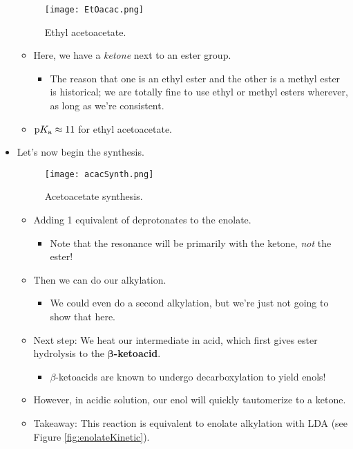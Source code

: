 \documentclass[../notes.tex]{subfiles}
\begin{document}
\begin{itemize}
\begin{figure}[h!]
        \centering
        \texttt{[image: EtOacac.png]}
        \caption{Ethyl acetoacetate.}
        \label{fig:EtOacac}
    \end{figure}
    \begin{itemize}
        \item Here, we have a \emph{ketone} next to an ester group.
        \begin{itemize}
            \item The reason that one is an ethyl ester and the other is a methyl ester is historical; we are totally fine to use ethyl or methyl esters wherever, as long as we're consistent.
        \end{itemize}
        \item $\textup{p}K_\textup{a}\approx 11$ for ethyl acetoacetate.
    \end{itemize}
    \item Let's now begin the synthesis.
    \begin{figure}[H]
        \centering
        \texttt{[image: acacSynth.png]}
        \caption{Acetoacetate synthesis.}
        \label{fig:acacSynth}
    \end{figure}
    \begin{itemize}
        \item Adding 1 equivalent of  deprotonates to the enolate.
        \begin{itemize}
            \item Note that the resonance will be primarily with the ketone, \emph{not} the ester!
        \end{itemize}
        \item Then we can do our alkylation.
        \begin{itemize}
            \item We could even do a second alkylation, but we're just not going to show that here.
        \end{itemize}
        \item Next step: We heat our intermediate in acid, which first gives ester hydrolysis to the \textbf{$\bm{\beta}$-ketoacid}.
        \begin{itemize}
            \item $\beta$-ketoacids are known to undergo decarboxylation to yield enols!
        \end{itemize}
        \item However, in acidic solution, our enol will quickly tautomerize to a ketone.
        \item Takeaway: This reaction is equivalent to enolate alkylation with LDA (see Figure \ref{fig:enolateKinetic}).

\end{itemize}
\end{itemize}
\end{document}
